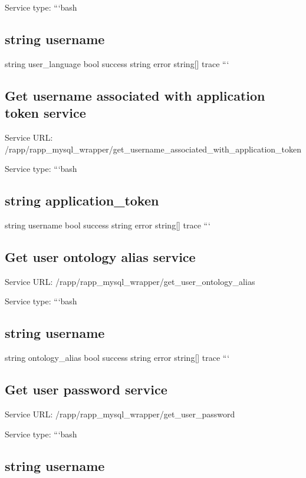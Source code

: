 Service type\-: ```bash \subsection*{string username }

string user\-\_\-language bool success string error string\mbox{[}\mbox{]} trace ```

\subsection*{Get username associated with application token service}

Service U\-R\-L\-: {\ttfamily /rapp/rapp\-\_\-mysql\-\_\-wrapper/get\-\_\-username\-\_\-associated\-\_\-with\-\_\-application\-\_\-token}

Service type\-: ```bash \subsection*{string application\-\_\-token }

string username bool success string error string\mbox{[}\mbox{]} trace ```

\subsection*{Get user ontology alias service}

Service U\-R\-L\-: {\ttfamily /rapp/rapp\-\_\-mysql\-\_\-wrapper/get\-\_\-user\-\_\-ontology\-\_\-alias}

Service type\-: ```bash \subsection*{string username }

string ontology\-\_\-alias bool success string error string\mbox{[}\mbox{]} trace ```

\subsection*{Get user password service}

Service U\-R\-L\-: {\ttfamily /rapp/rapp\-\_\-mysql\-\_\-wrapper/get\-\_\-user\-\_\-password}

Service type\-: ```bash \subsection*{string username }


